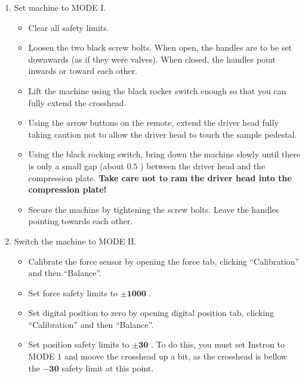 \documentclass[a4paper]{article}
\begin{document}
\begin{enumerate}
  \item Set machine to \textsf{MODE I}.
  \begin{itemize}
    \item Clear all safety limits.
    \item Loosen the two black screw bolts. When open, the handles are to be set downwards (as if they were valves). When closed, the handles point inwards or toward each other.
    \item Lift the machine using the black rocker switch enough so that you can fully extend the crosshead.
    \item Using the arrow buttons on the remote, extend the driver head fully taking caution not to allow the driver head to touch the sample pedestal.
    \item Using the black rocking switch, bring down the machine slowly until there is only a small gap (about $0.5$ \milli\meter) between the driver head and the compression plate. {\bf Take care not to ram the driver head into the compression plate!}
    \item Secure the machine by tightening the screw bolts. Leave the handles pointing towards each other.
  \end{itemize}
  \item Switch the machine to \textsf{MODE II}.
  \begin{itemize}  
    \item Calibrate the force sensor by opening the force tab, clicking ``Calibration'' and then ``Balance''.
    \item Set force safety limits to $\mathbf{\pm 1000}$ {\bf\newton}.
    \item Set digital position to zero by opening digital position tab, clicking ``Calibration'' and then ``Balance''.
    \item Set position safety limits to $\mathbf{\pm 30}$ {\bf\milli\meter}. To do this, you must set Instron to \textsf{MODE 1} and moove the crosshead up a bit, as the crosshead is bellow the $\mathbf{-30}$ {\bf\milli\meter} safety limit at this point.
  \end{itemize}
\end{enumerate}
\end{document}
